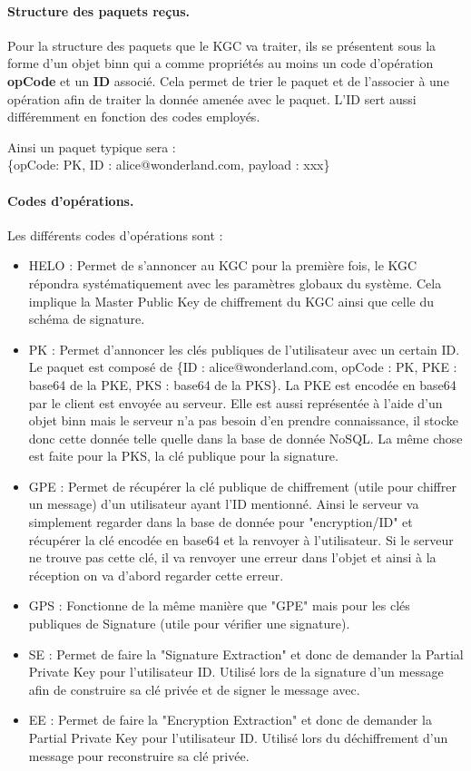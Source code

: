 \paragraph*{Structure des paquets reçus.}
Pour la structure des paquets que le KGC va traiter, ils se présentent sous la forme d'un objet binn qui a comme propriétés au moins un code d'opération \textbf{opCode} et un \textbf{ID} associé. Cela permet de trier le paquet et de l'associer à une opération afin de traiter la donnée amenée avec le paquet. L'ID sert aussi différemment en fonction des codes employés.

Ainsi un paquet typique sera :\\
\{opCode: PK, ID : alice@wonderland.com, payload : xxx\}
\paragraph*{Codes d'opérations.}
Les différents codes d'opérations sont :
\begin{itemize}
	\item HELO : Permet de s'annoncer au KGC pour la première fois, le KGC répondra systématiquement avec les paramètres globaux du système. Cela implique la Master Public Key de chiffrement du KGC ainsi que celle du schéma de signature. 
	\item PK : Permet d'annoncer les clés publiques de l'utilisateur avec un certain ID. Le paquet est composé de \{ID : alice@wonderland.com, opCode : PK, PKE : base64 de la PKE, PKS : base64 de la PKS\}. La PKE est encodée en base64 par le client est envoyée au serveur. Elle est aussi représentée à l'aide d'un objet binn mais le serveur n'a pas besoin d'en prendre connaissance, il stocke donc cette donnée telle quelle dans la base de donnée NoSQL. La même chose est faite pour la PKS, la clé publique pour la signature.
	\item GPE : Permet de récupérer la clé publique de chiffrement (utile pour chiffrer un message) d'un utilisateur ayant l'ID mentionné. Ainsi le serveur va simplement regarder dans la base de donnée pour "encryption/ID" et récupérer la clé encodée en base64 et la renvoyer à l'utilisateur. Si le serveur ne trouve pas cette clé, il va renvoyer une erreur dans l'objet et ainsi à la réception on va d'abord regarder cette erreur.
	\item GPS : Fonctionne de la même manière que "GPE" mais pour les clés publiques de Signature (utile pour vérifier une signature).
	\item SE : Permet de faire la "Signature Extraction" et donc de demander la Partial Private Key pour l'utilisateur ID. Utilisé lors de la signature d'un message afin de construire sa clé privée et de signer le message avec. 
	\item EE : Permet de faire la "Encryption Extraction" et donc de demander la Partial Private Key pour l'utilisateur ID. Utilisé lors du déchiffrement d'un message pour reconstruire sa clé privée.
\end{itemize}
